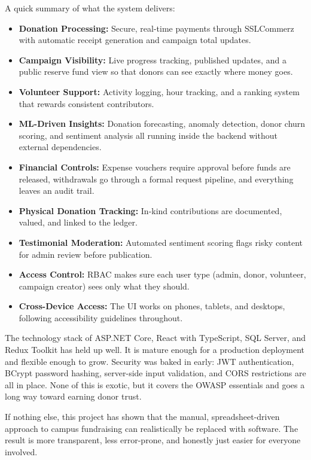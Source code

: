 \documentclass{thesis-library}
\begin{document}
A quick summary of what the system delivers:
\begin{itemize}
    \item \textbf{Donation Processing:} Secure, real-time payments through SSLCommerz with automatic receipt generation and campaign total updates.
    \item \textbf{Campaign Visibility:} Live progress tracking, published updates, and a public reserve fund view so that donors can see exactly where money goes.
    \item \textbf{Volunteer Support:} Activity logging, hour tracking, and a ranking system that rewards consistent contributors.
    \item \textbf{ML-Driven Insights:} Donation forecasting, anomaly detection, donor churn scoring, and sentiment analysis all running inside the backend without external dependencies.
    \item \textbf{Financial Controls:} Expense vouchers require approval before funds are released, withdrawals go through a formal request pipeline, and everything leaves an audit trail.
    \item \textbf{Physical Donation Tracking:} In-kind contributions are documented, valued, and linked to the ledger.
    \item \textbf{Testimonial Moderation:} Automated sentiment scoring flags risky content for admin review before publication.
    \item \textbf{Access Control:} RBAC makes sure each user type (admin, donor, volunteer, campaign creator) sees only what they should.
    \item \textbf{Cross-Device Access:} The UI works on phones, tablets, and desktops, following accessibility guidelines throughout.
\end{itemize}

The technology stack of ASP.NET Core, React with TypeScript, SQL Server, and Redux Toolkit has held up well. It is mature enough for a production deployment and flexible enough to grow.  Security was baked in early: JWT authentication, BCrypt password hashing, server-side input validation, and CORS restrictions are all in place. None of this is exotic, but it covers the OWASP essentials and goes a long way toward earning donor trust.

If nothing else, this project has shown that the manual, spreadsheet-driven approach to campus fundraising can realistically be replaced with software. The result is more transparent, less error-prone, and honestly just easier for everyone involved.
\end{document}
